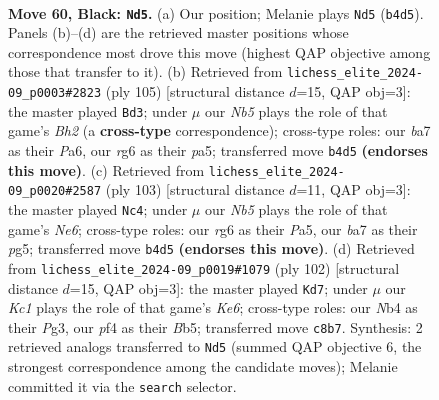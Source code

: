 \documentclass[11pt]{article}
\begin{document}
\clearpage

\begin{figure}[p]\centering
\begin{subfigure}{0.46\textwidth}\centering
\resizebox{\linewidth}{!}{%
\newchessgame
\chessboard[
  setfen={2k5/B1p5/6R1/5p2/Bn3P2/8/3K3P/8 b - - 2 60},
  showmover=false,
  pgfstyle=straightmove, color=movearrow, markmove={b4-d5}
]}
\caption{}
\end{subfigure}\hfill
\begin{subfigure}{0.46\textwidth}\centering
\resizebox{\linewidth}{!}{%
\newchessgame
\chessboard[
  setfen={8/7b/p7/P6k/2p2K1p/8/1P6/6R1 b - - 7 53},
  showmover=false,
  pgfstyle=straightmove, color=movearrow, markmove={h7-d3}
]}
\caption{}
\end{subfigure}
\\[4pt]
\begin{subfigure}{0.46\textwidth}\centering
\resizebox{\linewidth}{!}{%
\newchessgame
\chessboard[
  setfen={8/8/1p2k3/p3p1P1/4B3/2P1n1K1/P7/8 b - - 5 52},
  showmover=false,
  pgfstyle=straightmove, color=movearrow, markmove={e3-c4}
]}
\caption{}
\end{subfigure}\hfill
\begin{subfigure}{0.46\textwidth}\centering
\resizebox{\linewidth}{!}{%
\newchessgame
\chessboard[
  setfen={3b1k2/8/3PK2p/1B5p/8/4p1P1/8/8 w - - 3 52},
  showmover=false,
  pgfstyle=straightmove, color=movearrow, markmove={e6-d7}
]}
\caption{}
\end{subfigure}
\caption{\textbf{Move 60, Black: \texttt{Nd5}.} (a) Our position; Melanie plays \texttt{Nd5} (\texttt{b4d5}). Panels (b)--(d) are the retrieved master positions whose correspondence most drove this move (highest QAP objective among those that transfer to it). (b) Retrieved from \texttt{lichess\_elite\_2024-09\_p0003\#2823} (ply 105) [structural distance $d$=15, QAP obj=3]: the master played \texttt{Bd3}; under $\mu$ our \emph{Nb5} plays the role of that game's \emph{Bh2} (a \textbf{cross-type} correspondence); cross-type roles: our \emph{b}a7 as their \emph{P}a6, our \emph{r}g6 as their \emph{p}a5; transferred move \texttt{b4d5} \textbf{(endorses this move)}. (c) Retrieved from \texttt{lichess\_elite\_2024-09\_p0020\#2587} (ply 103) [structural distance $d$=11, QAP obj=3]: the master played \texttt{Nc4}; under $\mu$ our \emph{Nb5} plays the role of that game's \emph{Ne6}; cross-type roles: our \emph{r}g6 as their \emph{P}a5, our \emph{b}a7 as their \emph{p}g5; transferred move \texttt{b4d5} \textbf{(endorses this move)}. (d) Retrieved from \texttt{lichess\_elite\_2024-09\_p0019\#1079} (ply 102) [structural distance $d$=15, QAP obj=3]: the master played \texttt{Kd7}; under $\mu$ our \emph{Kc1} plays the role of that game's \emph{Ke6}; cross-type roles: our \emph{N}b4 as their \emph{P}g3, our \emph{p}f4 as their \emph{B}b5; transferred move \texttt{c8b7}. Synthesis: 2 retrieved analogs transferred to \texttt{Nd5} (summed QAP objective 6, the strongest correspondence among the candidate moves); Melanie committed it via the \texttt{search} selector.}
\label{fig:thought-m119}
\end{figure}
\end{document}
